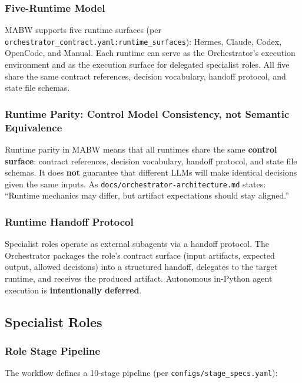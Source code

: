 \documentclass[11pt,a4paper]{article}
\begin{document}
\subsubsection{Five-Runtime Model}

MABW supports five runtime surfaces (per \texttt{orchestrator\_contract.yaml:runtime\_surfaces}): Hermes, Claude, Codex, OpenCode, and Manual. Each runtime can serve as the Orchestrator's execution environment and as the execution surface for delegated specialist roles. All five share the same contract references, decision vocabulary, handoff protocol, and state file schemas.

\subsubsection{Runtime Parity: Control Model Consistency, not Semantic Equivalence}

Runtime parity in MABW means that all runtimes share the same \textbf{control surface}: contract references, decision vocabulary, handoff protocol, and state file schemas. It does \textbf{not} guarantee that different LLMs will make identical decisions given the same inputs. As \texttt{docs/orchestrator-architecture.md} states: ``Runtime mechanics may differ, but artifact expectations should stay aligned.''

\subsubsection{Runtime Handoff Protocol}

Specialist roles operate as external subagents via a handoff protocol. The Orchestrator packages the role's contract surface (input artifacts, expected output, allowed decisions) into a structured handoff, delegates to the target runtime, and receives the produced artifact. Autonomous in-Python agent execution is \textbf{intentionally deferred}.

\subsection{Specialist Roles}

\subsubsection{Role Stage Pipeline}

The workflow defines a 10-stage pipeline (per \texttt{configs/stage\_specs.yaml}):
\end{document}
